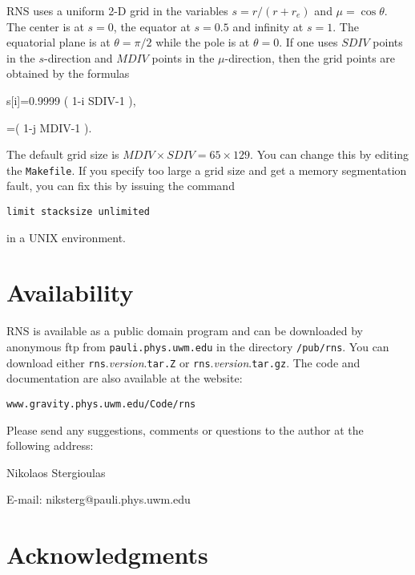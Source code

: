 \<RNS uses a uniform 2-D grid in the variables $s=r/(r+r_e)$ and $\mu=
 \cos \theta$. The center is at $s=0$, the equator at $s=0.5$ and infinity at
$s=1$. The equatorial plane is at $\theta=\pi/2$ while the pole is at $\theta=0$.
If one uses $SDIV$ points in the $s$-direction and $MDIV$ points in the 
$\mu$-direction, then the grid points are obtained by the formulas

\bee s[i]=0.9999 \Bigl( {1-i \over SDIV-1} \Bigr), \ee

\bee \mu[j]=\Bigl( {1-j \over MDIV-1} \Bigr). \ee

\<The default grid size is $MDIV \times SDIV=65 \times 129$. You can change this 
by editing the {\tt Makefile}. If you specify too large a grid size and get a 
memory segmentation fault, you can fix this by issuing the command 

\vspace{0.2cm}

{\tt limit stacksize unlimited}

\vspace{0.2cm}

\<in a UNIX environment.

\section{Availability}

RNS is available as a public domain program and can be downloaded by anonymous
ftp from {\tt pauli.phys.uwm.edu} in the directory 
{\tt /pub/rns}. 
You can download either {\tt rns}.{\it version}.{\tt tar.Z} or 
{\tt rns}.{\it version}.{\tt tar.gz}. 
The code and documentation are also available at the website:

\vspace{0.2cm}

{\tt www.gravity.phys.uwm.edu/Code/rns}

\vspace{0.2cm}

\<Please send any suggestions, comments or
questions to the author at the following address:

\vspace{0.2cm}

\< \hspace{0.7cm} Nikolaos Stergioulas

\< \hspace{0.7cm} E-mail: niksterg@pauli.phys.uwm.edu 

\section{Acknowledgments}

